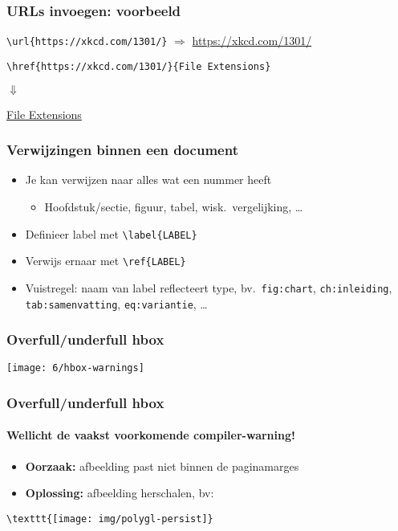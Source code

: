 \documentclass[aspectratio=169]{beamer}
\begin{document}
\begin{frame}[fragile]
  \frametitle{URLs invoegen: voorbeeld}

  \verb+\url{https://xkcd.com/1301/}+ $\Rightarrow$ \url{https://xkcd.com/1301/}

  \bigskip

  \verb+\href{https://xkcd.com/1301/}{File Extensions}+

  $\Downarrow$

  \href{https://xkcd.com/1301/}{File Extensions}

\end{frame}

\begin{frame}[fragile]
  \frametitle{Verwijzingen binnen een document}

  \begin{itemize}
    \item Je kan verwijzen naar alles wat een nummer heeft
          \begin{itemize}
            \item Hoofdstuk/sectie, figuur, tabel, wisk.~vergelijking, \ldots
          \end{itemize}
    \item Definieer label met \verb+\label{LABEL}+
    \item Verwijs ernaar met \verb+\ref{LABEL}+
    \item Vuistregel: naam van label reflecteert type, bv.~\texttt{fig:chart}, \texttt{ch:inleiding}, \texttt{tab:samenvatting}, \texttt{eq:variantie}, \ldots
  \end{itemize}

\end{frame}

\begin{frame}
  \frametitle{Overfull/underfull hbox}

  \texttt{[image: 6/hbox-warnings]}

\end{frame}

\begin{frame}[fragile]
  \frametitle{Overfull/underfull hbox}
  \framesubtitle{Wellicht de vaakst voorkomende compiler-warning!}

  \begin{itemize}
    \item \textbf{Oorzaak:} afbeelding past niet binnen de paginamarges
    \item \textbf{Oplossing:} afbeelding herschalen, bv:
  \end{itemize}

  \begin{verbatim}
\texttt{[image: img/polygl-persist]}
\end{verbatim}

\end{frame}
\end{document}
